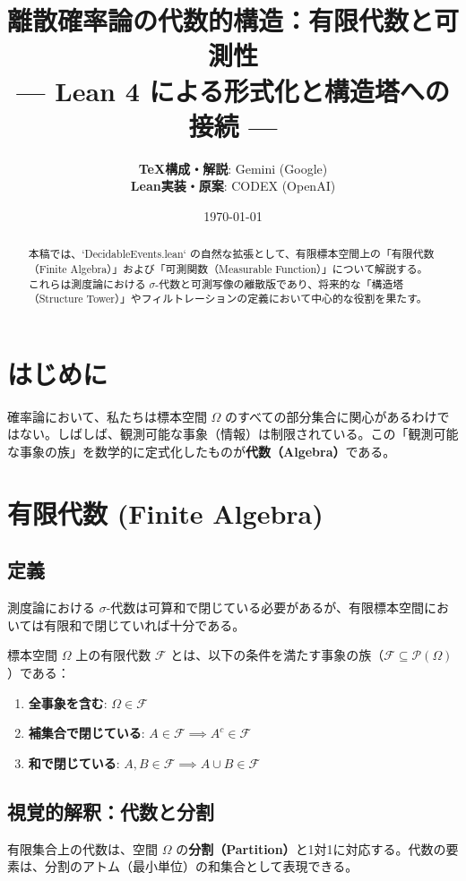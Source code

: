 \documentclass[a4paper,11pt]{article}
\title{\textbf{離散確率論の代数的構造：有限代数と可測性}\\
\large --- Lean 4 による形式化と構造塔への接続 ---}
\author{
    \textbf{TeX構成・解説}: Gemini (Google) \\
    \textbf{Lean実装・原案}: CODEX (OpenAI)
}
\date{\today}
\theoremstyle{definition}
\begin{document}
\maketitle

\begin{abstract}
本稿では、`DecidableEvents.lean` の自然な拡張として、有限標本空間上の「有限代数（Finite Algebra）」および「可測関数（Measurable Function）」について解説する。これらは測度論における $\sigma$-代数と可測写像の離散版であり、将来的な「構造塔（Structure Tower）」やフィルトレーションの定義において中心的な役割を果たす。
\end{abstract}

\tableofcontents

\section{はじめに}
確率論において、私たちは標本空間 $\Omega$ のすべての部分集合に関心があるわけではない。しばしば、観測可能な事象（情報）は制限されている。この「観測可能な事象の族」を数学的に定式化したものが\textbf{代数（Algebra）}である。

\section{有限代数 (Finite Algebra)}

\subsection{定義}
測度論における $\sigma$-代数は可算和で閉じている必要があるが、有限標本空間においては有限和で閉じていれば十分である。

\begin{tcolorbox}[colback=blue!5!white, colframe=blue!75!black, title=定義 1: 有限代数]
標本空間 $\Omega$ 上の有限代数 $\mathcal{F}$ とは、以下の条件を満たす事象の族（$\mathcal{F} \subseteq \mathcal{P}(\Omega)$）である：
\begin{enumerate}
    \item \textbf{全事象を含む}: $\Omega \in \mathcal{F}$
    \item \textbf{補集合で閉じている}: $A \in \mathcal{F} \implies A^c \in \mathcal{F}$
    \item \textbf{和で閉じている}: $A, B \in \mathcal{F} \implies A \cup B \in \mathcal{F}$
\end{enumerate}
\end{tcolorbox}

\subsection{視覚的解釈：代数と分割}
有限集合上の代数は、空間 $\Omega$ の\textbf{分割（Partition）}と1対1に対応する。代数の要素は、分割のアトム（最小単位）の和集合として表現できる。
\end{document}
